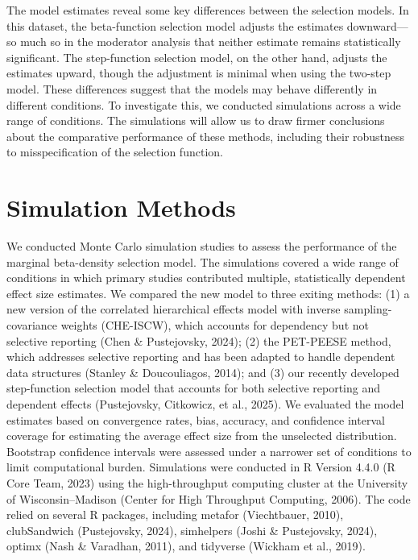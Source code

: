 \documentclass[
  american,
  man, donotrepeattitle,floatsintext]{apa7}
\begin{document}
The model estimates reveal some key differences between the selection models. In this dataset, the beta-function selection model adjusts the estimates downward---so much so in the moderator analysis that neither estimate remains statistically significant. The step-function selection model, on the other hand, adjusts the estimates upward, though the adjustment is minimal when using the two-step model.
These differences suggest that the models may behave differently in different conditions.
To investigate this, we conducted simulations across a wide range of conditions. The simulations will allow us to draw firmer conclusions about the comparative performance of these methods, including their robustness to misspecification of the selection function.

\section{Simulation Methods}\label{simulation-methods}

We conducted Monte Carlo simulation studies to assess the performance of the marginal beta-density selection model.
The simulations covered a wide range of conditions in which primary studies contributed multiple, statistically dependent effect size estimates.
We compared the new model to three exiting methods: (1) a new version of the correlated hierarchical effects model with inverse sampling-covariance weights (CHE-ISCW), which accounts for dependency but not selective reporting (Chen \& Pustejovsky, 2024); (2) the PET-PEESE method, which addresses selective reporting and has been adapted to handle dependent data structures (Stanley \& Doucouliagos, 2014); and (3) our recently developed step-function selection model that accounts for both selective reporting and dependent effects (Pustejovsky, Citkowicz, et al., 2025).
We evaluated the model estimates based on convergence rates, bias, accuracy, and confidence interval coverage for estimating the average effect size from the unselected distribution. Bootstrap confidence intervals were assessed under a narrower set of conditions to limit computational burden.
Simulations were conducted in R Version 4.4.0 (R Core Team, 2023) using the high-throughput computing cluster at the University of Wisconsin--Madison (Center for High Throughput Computing, 2006).
The code relied on several R packages, including metafor (Viechtbauer, 2010), clubSandwich (Pustejovsky, 2024), simhelpers (Joshi \& Pustejovsky, 2024), optimx (Nash \& Varadhan, 2011), and tidyverse (Wickham et al., 2019).
\end{document}
